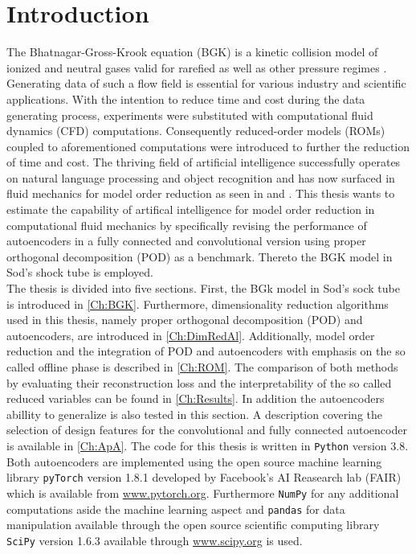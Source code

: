 
\chapter{Introduction}
\label{CH:intro}


The Bhatnagar-Gross-Krook equation (BGK) is a kinetic collision model of ionized and neutral gases valid for rarefied as well as other pressure regimes \cite{BGK}. Generating data of such a flow field is essential for various industry and scientific applications\cite{rarefiedGDapplc}. With the intention to reduce time and cost during the data generating process, experiments were substituted with computational fluid dynamics (CFD) computations. Consequently reduced-order models (ROMs) coupled to aforementioned computations were introduced to further the reduction of time and cost. The thriving field of artificial intelligence successfully operates on natural language processing and object recognition and has now surfaced in fluid mechanics for model order reduction as seen in \cite{Carlberg} and \cite{bukka2020assessment}. This thesis wants to estimate the capability of artifical intelligence for model order reduction in computational fluid mechanics by specifically revising the performance of autoencoders in a fully connected and convolutional version using proper orthogonal decomposition (POD) as a benchmark. Thereto the BGK model in Sod's shock tube is employed. \\

The thesis is divided into five sections. First, the BGk model in Sod's sock tube is introduced in \cref{Ch:BGK}. Furthermore, dimensionality reduction algorithms used in this thesis, namely proper orthogonal decomposition (POD) and autoencoders, are introduced in \cref{Ch:DimRedAl}. Additionally, model order reduction and the integration of POD and autoencoders with emphasis on the so called offline phase is described in \cref{Ch:ROM}. The comparison of both methods by evaluating their reconstruction loss and the interpretability of the so called reduced variables can be found in \cref{Ch:Results}. In addition the autoencoders abillity to generalize is also tested in this section. A description covering the selection of design features for the convolutional and fully connected autoencoder is available in \cref{Ch:ApA}. The code for this thesis is written in \texttt{Python} version 3.8. Both autoencoders are implemented using the open source machine learning library \texttt{pyTorch} version 1.8.1 developed by Facebook's AI Reasearch lab (FAIR) which is available from \url{www.pytorch.org}. Furthermore \texttt{NumPy} for any additional computations aside the machine learning aspect and \texttt{pandas} for data manipulation available through the open source scientific computing library \texttt{SciPy} version 1.6.3 available through \url{www.scipy.org} is used.\\  

